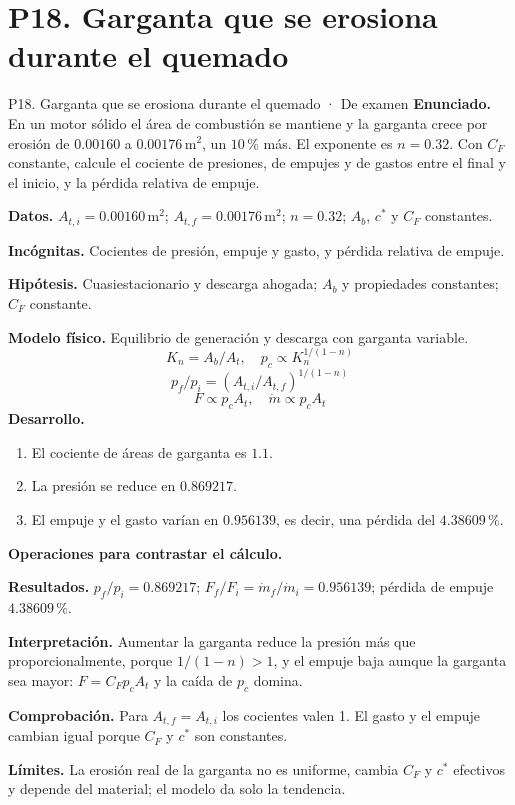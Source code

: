 \section{P18. Garganta que se erosiona durante el quemado}
\begin{studiumworked}{P18. Garganta que se erosiona durante el quemado · De examen}
\textbf{Enunciado.} En un motor sólido el área de combustión se mantiene y la garganta crece por erosión de $0.00160$ a $0.00176\,\mathrm{m^2}$, un $10\,\%$ más. El exponente es $n=0.32$. Con $C_F$ constante, calcule el cociente de presiones, de empujes y de gastos entre el final y el inicio, y la pérdida relativa de empuje.

\textbf{Datos.} $A_{t,i}=0.00160\,\mathrm{m^2}$; $A_{t,f}=0.00176\,\mathrm{m^2}$; $n=0.32$; $A_b$, $c^*$ y $C_F$ constantes.

\textbf{Incógnitas.} Cocientes de presión, empuje y gasto, y pérdida relativa de empuje.

\textbf{Hipótesis.} Cuasiestacionario y descarga ahogada; $A_b$ y propiedades constantes; $C_F$ constante.

\textbf{Modelo físico.} Equilibrio de generación y descarga con garganta variable.
\[K_n=A_b/A_t,\quad p_c\propto K_n^{1/(1-n)}\]
\[p_f/p_i=(A_{t,i}/A_{t,f})^{1/(1-n)}\]
\[F\propto p_cA_t,\quad \dot m\propto p_cA_t\]
\textbf{Desarrollo.}
\begin{enumerate}
\item El cociente de áreas de garganta es $1.1$.
\item La presión se reduce en $0.869217$.
\item El empuje y el gasto varían en $0.956139$, es decir, una pérdida del $4.38609\,\%$.
\end{enumerate}
\textbf{Operaciones para contrastar el cálculo.}

\textbf{Resultados.} $p_f/p_i=0.869217$; $F_f/F_i=\dot m_f/\dot m_i=0.956139$; pérdida de empuje $4.38609\,\%$.

\textbf{Interpretación.} Aumentar la garganta reduce la presión más que proporcionalmente, porque $1/(1-n)>1$, y el empuje baja aunque la garganta sea mayor: $F=C_Fp_cA_t$ y la caída de $p_c$ domina.

\textbf{Comprobación.} Para $A_{t,f}=A_{t,i}$ los cocientes valen 1. El gasto y el empuje cambian igual porque $C_F$ y $c^*$ son constantes.

\textbf{Límites.} La erosión real de la garganta no es uniforme, cambia $C_F$ y $c^*$ efectivos y depende del material; el modelo da solo la tendencia.
\end{studiumworked}
